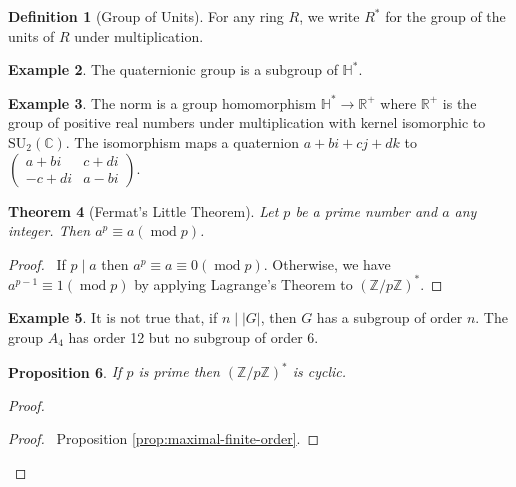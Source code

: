 \documentclass{book}
\let\qed\relax
\newtheorem{prop}{Proposition}[chapter]
\newtheorem{thm}[prop]{Theorem}
\theoremstyle{definition}
\newtheorem{df}[prop]{Definition}
\newtheorem{ex}[prop]{Example}
\renewcommand{\mod}{\ensuremath{\operatorname{mod}}}
\begin{document}
\begin{df}[Group of Units]
For any ring $R$, we write $R^*$ for the group of the units of $R$ under multiplication.
\end{df}

\begin{ex}
The quaternionic group is a subgroup of $\mathbb{H}^*$.
\end{ex}

\begin{ex}
The norm is a group homomorphism $\mathbb{H}^* \rightarrow \mathbb{R}^+$ where $\mathbb{R}^+$ is the group of positive real numbers under multiplication with kernel isomorphic to $\mathrm{SU}_2(\mathbb{C})$. The isomorphism maps a quaternion $a + bi + cj + dk$ to $\left( \begin{array}{cc}
a + bi & c + di \\ -c + di & a - bi
\end{array} \right)$.
\end{ex}

\begin{thm}[Fermat's Little Theorem]
Let $p$ be a prime number and $a$ any integer. Then $a^p \equiv a (\mod p)$.
\end{thm}

\begin{proof}
\pf\ If $p \mid a$ then $a^p \equiv a \equiv 0 (\mod p)$. Otherwise, we have $a^{p-1} \equiv 1 (\mod p)$ by applying Lagrange's Theorem to $(\mathbb{Z} / p \mathbb{Z})^*$. \qed
\end{proof}

\begin{ex}
It is not true that, if $n \mid |G|$, then $G$ has a subgroup of order $n$. The group $A_4$ has order 12 but no subgroup of order 6.
\end{ex}

\begin{prop}
    If $p$ is prime then $(\mathbb{Z} / p \mathbb{Z})^*$ is cyclic.
\end{prop}

\begin{proof}
    \pf
    \begin{proof}
        \pf\ Proposition \ref{prop:maximal-finite-order}.
    \end{proof}
    \qed
\end{proof}
\end{document}
